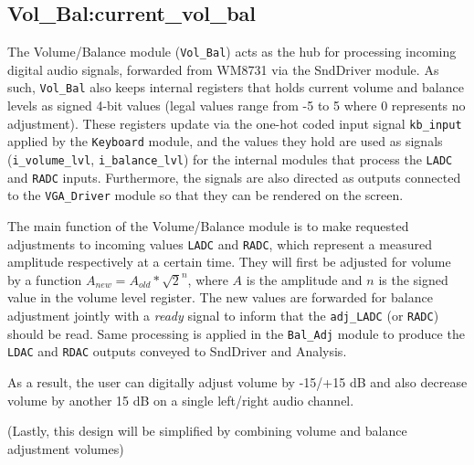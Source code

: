 \subsection{Vol\_Bal:current\_vol\_bal}

The Volume/Balance module (\verb=Vol_Bal=) acts as the hub for processing incoming digital audio signals, forwarded from WM8731 via the SndDriver module. As such, \verb=Vol_Bal= also keeps internal registers that holds current volume and balance levels as signed 4-bit values (legal values range from -5 to 5 where 0 represents no adjustment). These registers update via the one-hot coded input signal \verb=kb_input= applied by the \verb=Keyboard= module, and the values they hold are used as signals (\verb=i_volume_lvl=, \verb=i_balance_lvl=) for the internal modules that process the \verb=LADC= and \verb=RADC= inputs. Furthermore, the signals are also directed as outputs connected to the \verb=VGA_Driver= module so that they can be rendered on the screen.

The main function of the Volume/Balance module is to make requested adjustments to incoming values \verb=LADC= and \verb=RADC=, which represent a measured amplitude respectively at a certain time. They will first be adjusted for volume by a function $A_{new} = A_{old} * \sqrt{2}^n$, where $A$ is the amplitude and $n$ is the signed value in the volume level register. The new values are forwarded for balance adjustment jointly with a \emph{ready} signal to inform that the \verb=adj_LADC= (or \verb=RADC=) should be read. Same processing is applied in the \verb=Bal_Adj= module to produce the \verb=LDAC= and \verb=RDAC= outputs conveyed to SndDriver and Analysis.

As a result, the user can digitally adjust volume by -15/+15 dB and also decrease volume by another 15 dB on a single left/right audio channel.

(Lastly, this design will be simplified by combining volume and balance adjustment volumes)
